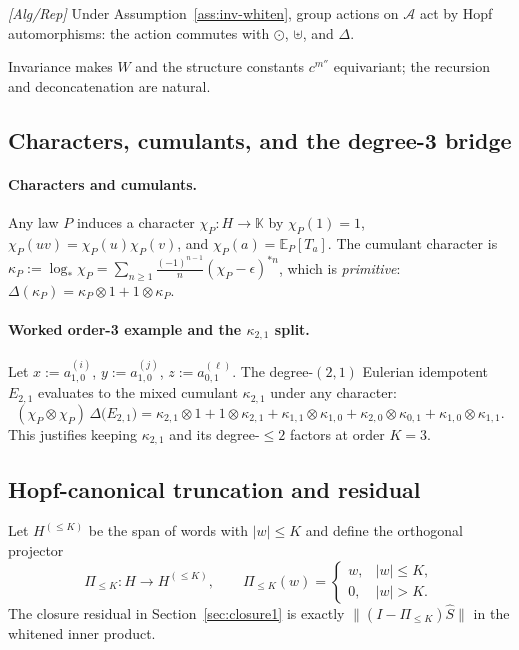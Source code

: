 \begin{proposition}\label{prop:equivariance}
\emph{[\textup{Alg/Rep}]}
Under Assumption~\ref{ass:inv-whiten}, group actions on $\mathcal A$ act by Hopf automorphisms: the action commutes with $\odot$, $\uplus$, and $\Delta$.
\begin{proofsketch}
Invariance makes $W$ and the structure constants $c^{m''}$ equivariant; the recursion and deconcatenation are natural.
\end{proofsketch}
\end{proposition}

\subsection{Characters, cumulants, and the degree-3 bridge}

\paragraph{Characters and cumulants.}
Any law $P$ induces a character $\chi_P:H\to\mathbb K$ by $\chi_P(1)=1$, $\chi_P(uv)=\chi_P(u)\chi_P(v)$, and $\chi_P(a)=\mathbb E_P[T_a]$. The cumulant character is $\kappa_P:=\log_*\chi_P=\sum_{n\ge1}\frac{(-1)^{n-1}}{n}(\chi_P-\epsilon)^{*n}$, which is \emph{primitive}: $\Delta(\kappa_P)=\kappa_P\otimes 1+1\otimes \kappa_P$.

\paragraph{Worked order-3 example and the $\kappa_{2,1}$ split.}
Let $x:=a^{(i)}_{1,0}$, $y:=a^{(j)}_{1,0}$, $z:=a^{(\ell)}_{0,1}$. The degree-$(2,1)$ Eulerian idempotent $E_{2,1}$ evaluates to the mixed cumulant $\kappa_{2,1}$ under any character:
\[
(\chi_P\otimes\chi_P)\,\Delta\!\big(E_{2,1}\big)
=\kappa_{2,1}\otimes 1+1\otimes \kappa_{2,1}+\kappa_{1,1}\otimes \kappa_{1,0}+\kappa_{2,0}\otimes \kappa_{0,1}+\kappa_{1,0}\otimes \kappa_{1,1}.
\]
This justifies keeping $\kappa_{2,1}$ and its degree-$\le2$ factors at order $K=3$.

\subsection{Hopf-canonical truncation and residual}
Let $H^{(\le K)}$ be the span of words with $|w|\le K$ and define the orthogonal projector
\[
\Pi_{\le K}:H\to H^{(\le K)},\qquad \Pi_{\le K}(w)=\begin{cases}w,&|w|\le K,\\0,&|w|>K.\end{cases}
\]
The closure residual in Section~\ref{sec:closure1} is exactly $\|(I-\Pi_{\le K})\hat S\|$ in the whitened inner product.

